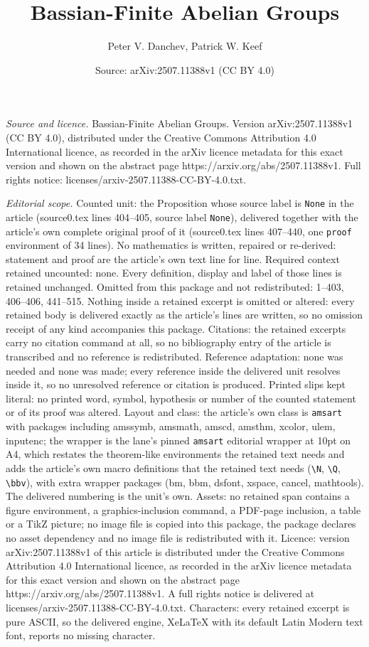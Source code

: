\documentclass[10pt,a4paper]{amsart}
\title[Bassian-Finite Abelian Groups]{Bassian-Finite Abelian Groups}
\author{Peter V. Danchev, Patrick W. Keef}
\date{Source: arXiv:2507.11388v1 (CC BY 4.0)}
\begin{document}
\maketitle

\noindent\emph{Source and licence.} Bassian-Finite Abelian Groups. Version arXiv:2507.11388v1 (CC BY 4.0), distributed under the Creative Commons Attribution 4.0 International licence, as recorded in the arXiv licence metadata for this exact version and shown on the abstract page https://arxiv.org/abs/2507.11388v1. Full rights notice: licenses/arxiv-2507.11388-CC-BY-4.0.txt.\par\smallskip

\noindent\textit{Editorial scope.} Counted unit: the Proposition whose source label is \texttt{None} in the article (source0.tex lines 404--405, source label \texttt{None}), delivered together with the article's own complete original proof of it (source0.tex lines 407--440, one \texttt{proof} environment of 34 lines). No mathematics is written, repaired or re-derived: statement and proof are the article's own text line for line. Required context retained uncounted: none. Every definition, display and label of those lines is retained unchanged. Omitted from this package and not redistributed: 1--403, 406--406, 441--515. Nothing inside a retained excerpt is omitted or altered: every retained body is delivered exactly as the article's lines are written, so no omission receipt of any kind accompanies this package. Citations: the retained excerpts carry no citation command at all, so no bibliography entry of the article is transcribed and no reference is redistributed. Reference adaptation: none was needed and none was made; every reference inside the delivered unit resolves inside it, so no unresolved reference or citation is produced. Printed slips kept literal: no printed word, symbol, hypothesis or number of the counted statement or of its proof was altered. Layout and class: the article's own class is \texttt{amsart} with packages including amssymb, amsmath, amscd, amsthm, xcolor, ulem, inputenc; the wrapper is the lane's pinned \texttt{amsart} editorial wrapper at 10pt on A4, which restates the theorem-like environments the retained text needs and adds the article's own macro definitions that the retained text needs (\texttt{\textbackslash N}, \texttt{\textbackslash Q}, \texttt{\textbackslash bbv}), with extra wrapper packages (bm, bbm, dsfont, xspace, cancel, mathtools). The delivered numbering is the unit's own. Assets: no retained span contains a figure environment, a graphics-inclusion command, a PDF-page inclusion, a table or a TikZ picture; no image file is copied into this package, the package declares no asset dependency and no image file is redistributed with it. Licence: version arXiv:2507.11388v1 of this article is distributed under the Creative Commons Attribution 4.0 International licence, as recorded in the arXiv licence metadata for this exact version and shown on the abstract page https://arxiv.org/abs/2507.11388v1. A full rights notice is delivered at licenses/arxiv-2507.11388-CC-BY-4.0.txt. Characters: every retained excerpt is pure ASCII, so the delivered engine, XeLaTeX with its default Latin Modern text font, reports no missing character.
\end{document}
